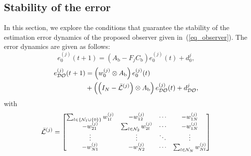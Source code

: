 \documentclass{ifacconf}
\def\eqref#1{(\ref{#1})}
\def\L{\mathcal{L}} %
\def\DO{\mathcal{DO}} %
\begin{document}

\vspace*{-0.1cm}
\subsection{Stability of the error}\label{subsec_Prove}
\vspace*{-0.2cm}
In this section, we explore the conditions that guarantee the stability of the
estimation error dynamics of the proposed observer given in~\eqref{eq_observer}. The error dynamics are given as follows:
%
\begin{equation}\label{eq_e0}
   e_0^{(j)}(t+1) = \left( A_{\text{b}} - F_{j} C_{\text{b}}  \right) e_0^{(j)}(t) + d_0^j,    
\end{equation}
    \begin{align}\label{eq_error}
        \small
        e_{\DO}^{(j)}(t+1) &= \left( w_{0}^{(j)} \otimes A_{\text{b}} \right) e_0^{(j)}(t)  \notag\\ 
        &+ \left( \left( I_{N} - \bar{\L}^{(j)}  \right)  \otimes  A_{\text{b}} \right) e_{\DO}^{(j)}(t) + d_{\DO}^j,
    \end{align}
with
\begin{equation*}
    \small
    \bar{\L}^{(j)} = \begin{bmatrix}
           \sum_{l \in  \{\mathcal{N}_1 \cup \{ 0 \}\}} w_{1l}^{(j)} & -w_{12}^{(j)} & \cdots & -w_{1N}^{(j)} \\
            -w_{21}^{(j)} & \sum_{l \in \mathcal{N}_2}w_{2l}^{(j)} & \cdots & -w_{1N}^{(j)} \\
           \vdots & \vdots & \ddots & \vdots \\
            -w_{N1}^{(j)} & -w_{N2}^{(j)}& \cdots & \sum_{l \in \mathcal{N}_N}w_{Nl}^{(j)} \\
        \end{bmatrix}
\end{equation*}
\end{document}
